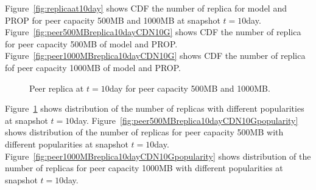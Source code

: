 \documentclass[conference]{IEEEtran}
\begin{document}
Figure~\ref{fig:replicaat10day} shows CDF the number of replica for model and PROP for peer capacity 500MB and 1000MB at snapshot $t=10$day.
Figure~\ref{fig:peer500MBreplica10dayCDN10G} shows CDF the number of replica for peer capacity 500MB of model and PROP. 
Figure~\ref{fig:peer1000MBreplica10dayCDN10G} shows CDF the number of replica fof peer capacity 1000MB of model and PROP.

\begin{figure}[!htb]
\centering
{}
\hfill
{}
\caption{Peer replica at $t=10$day for peer capacity 500MB and 1000MB.}
\label{fig:replicaat10daybypopularity}
\vspace{-2mm}
\end{figure}


Figure~\ref{fig:replicaat10daybypopularity} shows distribution of the number of replicas with different popularities at snapshot $t=10$day.
Figure~\ref{fig:peer500MBreplica10dayCDN10Gpopularity} shows distribution of the number of replicas for peer capacity 500MB with different popularities at snapshot $t=10$day.
Figure~\ref{fig:peer1000MBreplica10dayCDN10Gpopularity} shows distribution of the number of replicas for peer capacity 1000MB with different popularities at snapshot $t=10$day.
\end{document}
